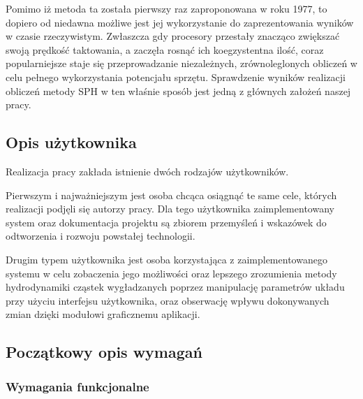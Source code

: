 \documentclass[polish, 12pt]{aghthesis}
\begin{document}
	$\,$
	
	Pomimo iż metoda ta została pierwszy raz zaproponowana w roku 1977, to dopiero od niedawna możliwe jest jej wykorzystanie do zaprezentowania wyników w czasie rzeczywistym. Zwłaszcza gdy procesory przestały znacząco zwiększać swoją prędkość taktowania, a zaczęła rosnąć ich koegzystentna ilość, coraz popularniejsze staje się przeprowadzanie niezależnych, zrównoleglonych obliczeń w celu pełnego wykorzystania potencjału sprzętu. Sprawdzenie wyników realizacji obliczeń metody SPH w ten właśnie sposób jest jedną z głównych założeń naszej pracy.
	
	\clearpage	
	
	\subsection{Opis użytkownika}
	
	Realizacja pracy zakłada istnienie dwóch rodzajów użytkowników.
	
	Pierwszym i najważniejszym jest osoba chcąca osiągnąć te same cele, których realizacji podjęli się autorzy pracy. Dla tego użytkownika zaimplementowany system oraz dokumentacja projektu są zbiorem przemyśleń i wskazówek do odtworzenia i rozwoju powstałej technologii.
	
	Drugim typem użytkownika jest osoba korzystająca z zaimplementowanego systemu w celu zobaczenia jego możliwości oraz lepszego zrozumienia metody hydrodynamiki cząstek wygładzanych poprzez manipulację parametrów układu przy użyciu interfejsu użytkownika, oraz obserwację wpływu dokonywanych zmian dzięki modułowi graficznemu aplikacji.
	
	\subsection{Początkowy opis wymagań}
	
		\subsubsection{Wymagania funkcjonalne}
		
\end{document}
